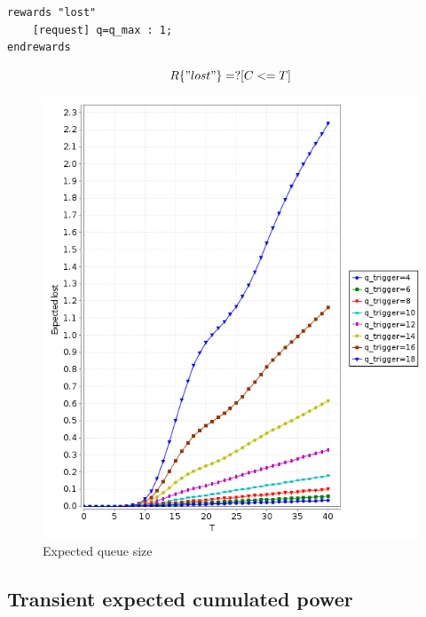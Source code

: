 \begin{verbatim}
rewards "lost"
	[request] q=q_max : 1;
endrewards
\end{verbatim}
\begin{displaymath}
  R\{"lost"\}=? [ C<=T ]
\end{displaymath}
\begin{figure}[htb]
  \centering
  \includegraphics[width=13cm]{quantitative-project/expected-missed-requests.png}
  \caption{Expected queue size}
  \label{fig:expected-queue-size}
\end{figure}

\subsection{Transient expected cumulated power }

